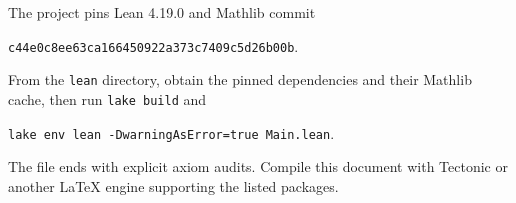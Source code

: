 \documentclass[11pt]{article}
\begin{document}
The project pins Lean 4.19.0 and Mathlib commit
\begin{center}
\texttt{c44e0c8ee63ca166450922a373c7409c5d26b00b}.
\end{center}
From the \texttt{lean} directory, obtain the pinned dependencies and
their Mathlib cache, then run \texttt{lake build} and
\begin{center}
\texttt{lake env lean -DwarningAsError=true Main.lean}.
\end{center}
The file ends with explicit axiom audits. Compile this document with
Tectonic or another LaTeX engine supporting the listed packages.
\end{document}
